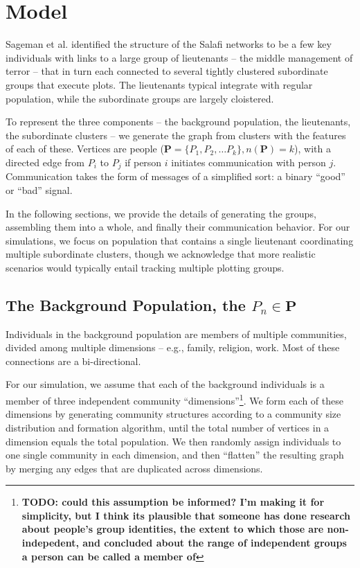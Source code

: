 \documentclass{article}
\begin{document}
\section*{Model}
Sageman et al. identified the structure of the Salafi networks to be a few key individuals with links to a large group of lieutenants -- the middle management of terror -- that in turn each connected to several tightly clustered subordinate groups that execute plots.  The lieutenants typical integrate with regular population, while the subordinate groups are largely cloistered.

To represent the three components -- the background population, the lieutenants, the subordinate clusters -- we generate the graph from clusters with the features of each of these.  Vertices are people ($\mathbf{P}=\{P_1, P_2, \ldots P_k\}, n(\mathbf{P})=k$), with a directed edge from $P_i$ to $P_j$ if person $i$ initiates communication with person $j$.  Communication takes the form of messages of a simplified sort: a binary ``good'' or ``bad'' signal.

In the following sections, we provide the details of generating the groups, assembling them into a whole, and finally their communication behavior.  For our simulations, we focus on population that contains a single lieutenant coordinating multiple subordinate clusters, though we acknowledge that more realistic scenarios would typically entail tracking multiple plotting groups.

\subsection*{The Background Population, the $P_{n}\in\mathbf{P}$}
Individuals in the background population are members of multiple communities, divided among multiple dimensions -- e.g., family, religion, work.  Most of these connections are a bi-directional.

For our simulation, we assume that each of the background individuals is a member of three independent community ``dimensions''\footnote{{\bf TODO: could this assumption be informed? I'm making it for simplicity, but I think its plausible that someone has done research about people's group identities, the extent to which those are non-indepedent, and concluded about the range of independent groups a person can be called a member of}}.  We form each of these dimensions by generating community structures according to a community size distribution and formation algorithm, until the total number of vertices in a dimension equals the total population.  We then randomly assign individuals to one single community in each dimension, and then ``flatten'' the resulting graph by merging any edges that are duplicated across dimensions.
\end{document}
